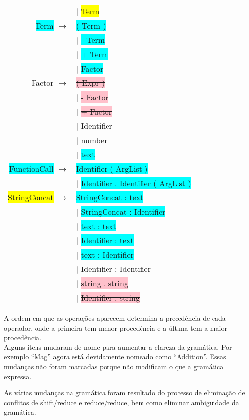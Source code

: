 \documentclass[12pt]{article}
\begin{document}
\begin{longtable}{ r l }
									& $|$ \colorbox{yellow}{Term} \\
	\colorbox{cyan}{Term}		$\rightarrow$ 	& \colorbox{cyan}{( Term )} \\
									& $|$ \colorbox{cyan}{- Term} \\
									& $|$ \colorbox{cyan}{+ Term} \\
									& $|$ \colorbox{cyan}{Factor} \\
	Factor			$\rightarrow$ 	& \colorbox{pink}{\sout{( Expr )}} \\
									& $|$  \colorbox{pink}{\sout{- Factor}} \\
									& $|$  \colorbox{pink}{\sout{+ Factor}} \\
									& $|$  Identifier \\
									& $|$  number \\
									& $|$  \colorbox{cyan}{text} \\
	\colorbox{cyan}{FunctionCall}	$\rightarrow$ 	& \colorbox{cyan}{Identifier ( ArgList )} \\
									& $|$ \colorbox{cyan}{Identifier . Identifier ( ArgList )} \\
	\colorbox{yellow}{StringConcat}	$\rightarrow$	& \colorbox{cyan}{StringConcat : text} \\
									& $|$ \colorbox{cyan}{StringConcat : Identifier} \\
									& $|$ \colorbox{cyan}{text : text} \\
									& $|$ \colorbox{cyan}{Identifier : text} \\
									& $|$ \colorbox{cyan}{text : Identifier} \\
									& $|$ Identifier : Identifier\\
									& $|$ \colorbox{pink}{\sout{string . string}} \\
									& $|$ \colorbox{pink}{\sout{Identifier . string}} \\
\end{longtable}

A ordem em que as operações aparecem determina a precedência de cada operador, onde a primeira tem menor procedência e a última tem a maior procedência.\\

Alguns itens mudaram de nome para aumentar a clareza da gramática. Por exemplo ``Mag'' agora está devidamente nomeado como ``Addition''. Essas mudanças não foram marcadas porque não modificam o que a gramática expressa.

As várias mudanças na gramática foram resultado do processo de eliminação de conflitos de shift/reduce e reduce/reduce, bem como eliminar ambiguidade da gramática.
\end{document}
